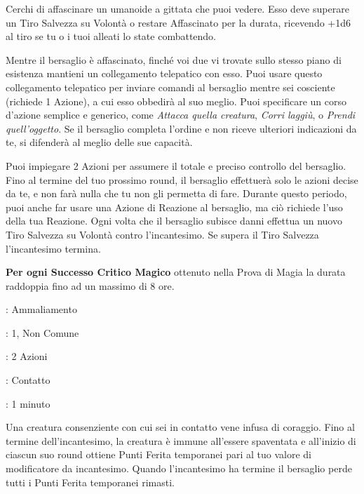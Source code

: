 \begin{multicols}{2}
Cerchi di affascinare un umanoide a gittata che puoi vedere. Esso deve superare un Tiro Salvezza su Volontà o restare Affascinato per la durata, ricevendo +1d6 al tiro se tu o i tuoi alleati lo state combattendo.

Mentre il bersaglio è affascinato, finché voi due vi trovate sullo stesso piano di esistenza mantieni un collegamento telepatico con esso. Puoi usare questo collegamento telepatico per inviare comandi al bersaglio mentre sei cosciente (richiede 1 Azione), a cui esso obbedirà al suo meglio. Puoi specificare un corso d'azione semplice e generico, come \emph{Attacca quella creatura}, \emph{Corri laggiù}, o \emph{Prendi quell'oggetto}. Se il bersaglio completa l'ordine e non riceve ulteriori indicazioni da te, si difenderà al meglio delle sue capacità.

Puoi impiegare 2 Azioni per assumere il totale e preciso controllo del bersaglio. Fino al termine del tuo prossimo round, il bersaglio effettuerà solo le azioni decise da te, e non farà nulla che tu non gli permetta di fare. Durante questo periodo, puoi anche far usare una Azione di Reazione al bersaglio, ma ciò richiede l'uso della tua Reazione. Ogni volta che il bersaglio subisce danni effettua un nuovo Tiro Salvezza su Volontà contro l'incantesimo. Se supera il Tiro Salvezza l'incantesimo termina.

\textbf{Per ogni Successo Critico Magico} ottenuto nella Prova di Magia la durata raddoppia fino ad un massimo di 8 ore.

\noindent\colorbox{OBSSgold!10}{
\begin{minipage}{0.95\linewidth}
\begin{description}[noitemsep, topsep=0pt, parsep=0pt, partopsep=0pt, leftmargin=0cm, labelwidth=1.3cm]
	\item[\textbf{Lista}]: Ammaliamento
	\item[\textbf{Livello}]: 1, Non Comune
	\item[\textbf{Lancio}]: 2 Azioni
	\item[\textbf{Gittata}]: Contatto
	\item[\textbf{Durata}]: 1 minuto
\end{description}
\end{minipage}}\smallskip

Una creatura consenziente con cui sei in contatto vene infusa di coraggio. Fino al termine dell'incantesimo, la creatura è immune all'essere spaventata e all'inizio di ciascun suo round ottiene Punti Ferita temporanei pari al tuo valore di modificatore da incantesimo. Quando l'incantesimo ha termine il bersaglio perde tutti i Punti Ferita temporanei rimasti.


\end{multicols}
